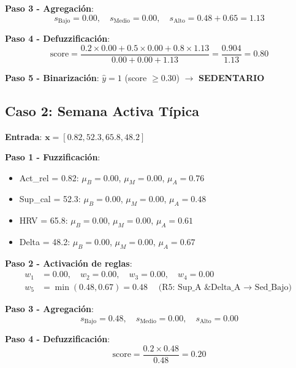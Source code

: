 \documentclass[12pt,letterpaper,twoside]{report}
\newcommand{\vect}[1]{\boldsymbol{#1}}
\begin{document}
\textbf{Paso 3 - Agregación}:
\begin{equation*}
s_{\text{Bajo}} = 0.00, \quad s_{\text{Medio}} = 0.00, \quad s_{\text{Alto}} = 0.48 + 0.65 = 1.13
\end{equation*}

\textbf{Paso 4 - Defuzzificación}:
\begin{equation*}
\text{score} = \frac{0.2 \times 0.00 + 0.5 \times 0.00 + 0.8 \times 1.13}{0.00 + 0.00 + 1.13} = \frac{0.904}{1.13} = 0.80
\end{equation*}

\textbf{Paso 5 - Binarización}: $\hat{y} = 1$ (score $\geq 0.30$) $\to$ \textbf{SEDENTARIO}

\subsection{Caso 2: Semana Activa Típica}

\textbf{Entrada}: $\vect{x} = [0.82, 52.3, 65.8, 48.2]$

\textbf{Paso 1 - Fuzzificación}:

\begin{itemize}[noitemsep]
\item Act\_rel = 0.82: $\mu_B = 0.00$, $\mu_M = 0.00$, $\mu_A = 0.76$
\item Sup\_cal = 52.3: $\mu_B = 0.00$, $\mu_M = 0.00$, $\mu_A = 0.48$
\item HRV = 65.8: $\mu_B = 0.00$, $\mu_M = 0.00$, $\mu_A = 0.61$
\item Delta = 48.2: $\mu_B = 0.00$, $\mu_M = 0.00$, $\mu_A = 0.67$
\end{itemize}

\textbf{Paso 2 - Activación de reglas}:
\begin{align*}
w_1 &= 0.00, \quad w_2 = 0.00, \quad w_3 = 0.00, \quad w_4 = 0.00 \\
w_5 &= \min(0.48, 0.67) = 0.48 \quad \text{(R5: Sup\_A \& Delta\_A $\to$ Sed\_Bajo)}
\end{align*}

\textbf{Paso 3 - Agregación}:
\begin{equation*}
s_{\text{Bajo}} = 0.48, \quad s_{\text{Medio}} = 0.00, \quad s_{\text{Alto}} = 0.00
\end{equation*}

\textbf{Paso 4 - Defuzzificación}:
\begin{equation*}
\text{score} = \frac{0.2 \times 0.48}{0.48} = 0.20
\end{equation*}
\end{document}
